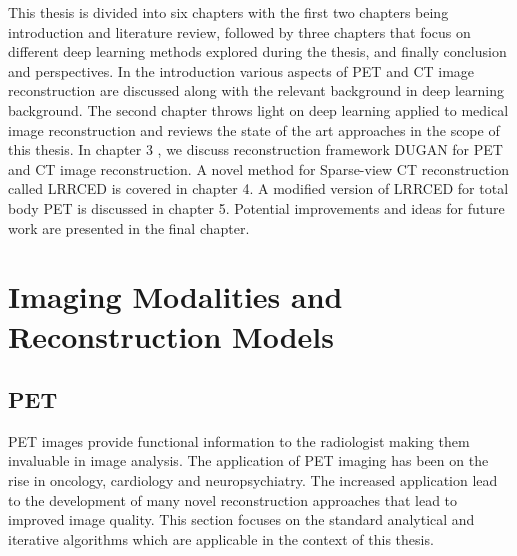 This thesis is divided into six chapters with the first two chapters being introduction and literature review, followed by three chapters that focus on different deep learning methods explored during the thesis, and finally conclusion and perspectives. In the introduction various aspects of \ac{PET} and \ac{CT} image reconstruction are discussed along with the relevant background in deep learning background. The second chapter throws light on deep learning applied to medical image reconstruction and reviews the state of the art approaches in the scope of this thesis. 
In chapter 3 , we discuss reconstruction framework \ac{DUGAN} for \ac{PET} and \ac{CT} image reconstruction. A novel method for Sparse-view \ac{CT} reconstruction called \ac{LRRCED} is covered in chapter 4. A modified version of \ac{LRRCED} for total body \ac{PET} is discussed in chapter 5. Potential improvements and ideas for future work are presented in the final chapter. 


\section{Imaging Modalities and Reconstruction Models}


\subsection{PET}


\ac{PET} images provide functional information to the radiologist making them invaluable in image analysis. The application of \ac{PET} imaging has been on the rise in oncology, cardiology and neuropsychiatry. The increased application lead to the development of many novel reconstruction approaches that lead to improved image quality. This section focuses on the standard analytical and iterative algorithms which are applicable in the context of this thesis. 

